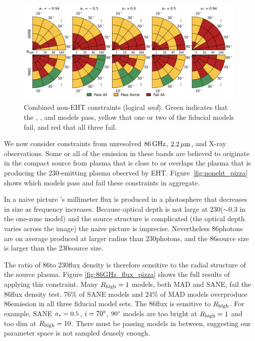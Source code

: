 \begin{figure}
  \centering
  \includegraphics[width=\textwidth]{./figures/Non_Interferometric_Constraints.png}
  \caption{Combined non-EHT constraints (logical {\em and}).
    Green indicates that the \kharma, \bhac, and \hamr models pass, yellow that one or two of the fiducial models fail, and red that all three fail.}
  \label{fig:non_eht_cuts}
\end{figure}

We now consider constraints from unresolved $86\,\mathrm{GHz}$, $2.2\,\mu\mathrm{m}$, and X-ray
observations.
Some or all of the emission in these bands are believed to originate
in the compact source from plasma that is close to or overlaps the
plasma that is producing the 230\GHz-emitting plasma observed by EHT.
Figure~\ref{fig:noneht_pizza} shows which models pass and fail these
constraints in aggregate.


In a naive picture \sgra's millimeter flux is produced in a photosphere that decreases in size as frequency increases.
Because optical depth is not large at 230\GHz ($\sim 0.3$ in the one-zone model) and the source structure is complicated (the optical depth varies across the image) the naive picture is imprecise.
Nevertheless 86\GHz photons are on average produced at larger radius than 230\GHz photons, and the 86\GHz source size is larger than the 230\GHz source size.

The ratio of 86\GHz to 230\GHz flux density is therefore sensitive to the radial structure of the source plasma.
Figure \ref{fig:86GHz_flux_pizza} shows the full results of applying this constraint.
Many $R_\mathrm{high} = 1$ models, both MAD and SANE, fail the 86\GHz flux density test.
$76\%$ of SANE models and $24\%$ of MAD models overproduce 86\GHz emission in all three fiducial model sets.
The 86\GHz flux is sensitive to $R_\mathrm{high}$.
For example, SANE $a_* = 0.5$, $i = 70\degree$, $90\degree$ models are too bright at $R_\mathrm{high} = 1$ and too dim at $R_\mathrm{high} = 10$.
There must be passing models in between, suggesting our parameter space is not sampled densely enough.


